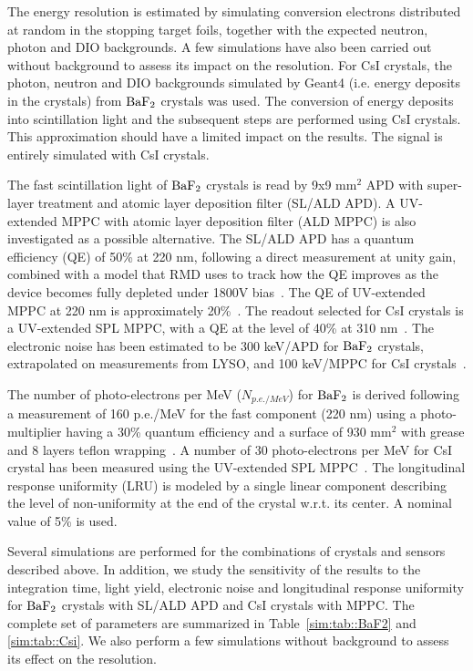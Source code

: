 The energy resolution is estimated by simulating conversion electrons distributed at random in the stopping target foils, 
together with the expected neutron, photon and DIO backgrounds. A few simulations have also been carried out without 
background to assess its impact on the resolution. For CsI crystals, the photon, neutron and DIO backgrounds simulated by Geant4 
(i.e. energy deposits in the crystals) from $\rm BaF_2$ crystals was used. The conversion of energy deposits into scintillation 
light and the subsequent steps are performed using CsI crystals. This approximation should have a limited impact on the results. 
The signal is entirely simulated with CsI crystals. 

The fast scintillation light of $\rm BaF_2$ crystals is read by 9x9 mm$^2$ APD with super-layer treatment and atomic layer deposition 
filter (SL/ALD APD). A UV-extended MPPC with atomic layer deposition filter (ALD MPPC) is also investigated as a possible alternative. 
The SL/ALD APD has a quantum efficiency (QE) of 50\% at 220 nm, following a direct measurement at unity gain, combined with a model 
that RMD uses to track how the QE improves as the device becomes fully depleted under 1800V bias~\cite{docdb-david}. The QE of 
UV-extended MPPC at 220 nm is approximately 20\%~. The readout selected for CsI crystals is a UV-extended SPL MPPC, with a 
QE at the level of 40\% at 310 nm~\cite{docdb5166}. The electronic noise has been estimated to be 300 keV/APD for $\rm BaF_2$ crystals, 
extrapolated on measurements from LYSO, and 100 keV/MPPC for CsI crystals~\cite{docdb5405}.  

The number of photo-electrons per MeV ($N_{p.e./ MeV}$) for $\rm BaF_2$ is derived following a measurement of 160 p.e./MeV for the fast 
component (220 nm) using a photo-multiplier having a 30\% quantum efficiency and a surface of 930 mm$^2$ with grease and 8 layers teflon 
wrapping~\cite{docdb5716}. A number of 30 photo-electrons per MeV for CsI crystal has been measured using the UV-extended SPL MPPC~\cite{docdb5166}. The longitudinal 
response uniformity (LRU) is modeled by a single linear component describing the level of non-uniformity at the end of the crystal w.r.t. 
its center. A nominal value of 5\% is used.
 
Several simulations are performed for the combinations of crystals and sensors described above. In addition, we study the sensitivity of 
the results to the integration time, light yield, electronic noise and longitudinal response uniformity for $\rm BaF_2$ crystals with 
SL/ALD APD and CsI crystals with MPPC. The complete set of parameters are summarized in Table~\ref{sim:tab::BaF2} and \ref{sim:tab::Csi}. 
We also perform a few simulations without background to assess its effect on the resolution. 


